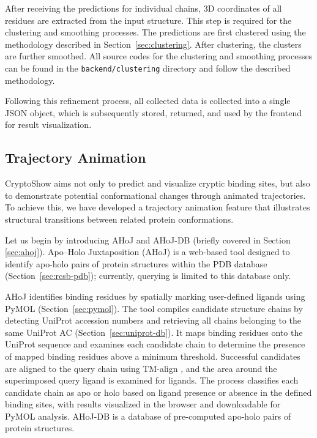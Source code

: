 After receiving the predictions for individual chains, 3D coordinates of all residues are extracted from the input structure. This step is required for the clustering and smoothing processes. The predictions are first clustered using the methodology described in Section~\ref{sec:clustering}. After clustering, the clusters are further smoothed. All source codes for the clustering and smoothing processes can be found in the \lstinline!backend/clustering! directory and follow the described methodology.

Following this refinement process, all collected data is collected into a single JSON object, which is subsequently stored, returned, and used by the frontend for result visualization.

\subsection{Trajectory Animation}
\label{sec:trajectory}

CryptoShow aims not only to predict and visualize cryptic binding sites, but also to demonstrate potential conformational changes through animated trajectories. To achieve this, we have developed a trajectory animation feature that illustrates structural transitions between related protein conformations.

Let us begin by introducing AHoJ \cite{feidakis2022ahoj} and AHoJ-DB \cite{feidakis2024ahoj} (briefly covered in Section \ref{sec:ahoj}). Apo–Holo Juxtaposition (AHoJ) is a web-based tool designed to identify apo-holo pairs of protein structures within the PDB database (Section~\ref{sec:rcsb-pdb}); currently, querying is limited to this database only.

AHoJ identifies binding residues by spatially marking user-defined ligands using PyMOL (Section~\ref{sec:pymol}). The tool compiles candidate structure chains by detecting UniProt accession numbers and retrieving all chains belonging to the same UniProt AC (Section~\ref{sec:uniprot-db}). It maps binding residues onto the UniProt sequence and examines each candidate chain to determine the presence of mapped binding residues above a minimum threshold. Successful candidates are aligned to the query chain using TM-align \cite{zhang2005tm}, and the area around the superimposed query ligand is examined for ligands. The process classifies each candidate chain as apo or holo based on ligand presence or absence in the defined binding sites, with results visualized in the browser and downloadable for PyMOL analysis. AHoJ-DB is a database of pre-computed apo-holo pairs of protein structures.

